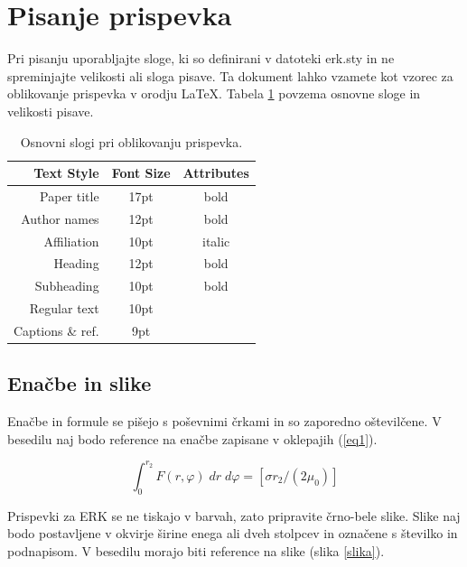 \documentclass[a4paper]{article}
\begin{document}
\section{Pisanje prispevka}

Pri pisanju uporabljajte sloge, ki so definirani v datoteki erk.sty in ne spreminjajte velikosti ali sloga pisave. Ta dokument lahko vzamete kot vzorec za oblikovanje prispevka v orodju \LaTeX.
Tabela \ref{tab1} povzema osnovne sloge in velikosti pisave.

\begin{table}[h]
\caption{Osnovni slogi pri oblikovanju prispevka.} \label{tab1}
\smallskip
\begin{center}
\begin{tabular}{ | r | c | c | }
\hline  
  \textbf{Text Style} & \textbf{Font Size} & \textbf{Attributes}\\ 
\hline  
  Paper title & 17pt & bold\\
  Author names & 12pt & bold\\
  Affiliation & 10pt & italic\\
  Heading & 12pt & bold \\
  Subheading & 10pt & bold\\
  Regular text & 10pt &\\
  Captions \& ref. & 9pt &\\
\hline  
\end{tabular}
\end{center}
\end{table}

\subsection{Enačbe in slike}

Enačbe in formule se pišejo s poševnimi črkami in so zaporedno oštevilčene. V besedilu naj bodo reference na enačbe zapisane v oklepajih (\ref{eq1}).

\begin{equation}
 \int^{r_{2}}_{0}F(r,\varphi)\; dr\; d\varphi= [\sigma r_{2} / (2\mu_{0})]
    \label{eq1}
\end{equation}

Prispevki za ERK se ne tiskajo v barvah, zato pripravite črno-bele slike. Slike naj bodo postavljene v okvirje širine enega ali dveh stolpcev in označene s številko in podnapisom. V besedilu morajo biti reference na slike (slika \ref{slika}).
\end{document}
